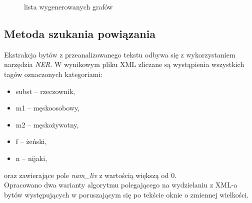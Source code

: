 \documentclass[12pt,a4paper]{article} %
\begin{document}
        
        \begin{figure}[h!]
                \centering
                \caption{lista wygenerowanych grafów}
            \end{figure}
   

\newpage
    \subsection{Metoda szukania powiązania}
        Ekstrakcja bytów z przeanalizowanego tekstu odbywa się z wykorzystaniem narzędzia \textit{NER}. W wynikowym pliku XML zliczane są wystąpienia wszystkich tagów oznaczonych kategoriami:
        \begin{itemize}
            \item subst -- rzeczownik,
            \item m1 -- męskoosobowy,
            \item m2 -- męskożywotny,
            \item f -- żeński,
            \item n -- nijaki,
        \end{itemize}
        oraz zawierające pole \emph{nam\_liv} z wartością większą od 0.\\
        
        Opracowano dwa warianty algorytmu polegającego na wydzielaniu z XML-a bytów występujących w poruszającym się po tekście oknie o zmiennej wielkości.
        
\end{document}
